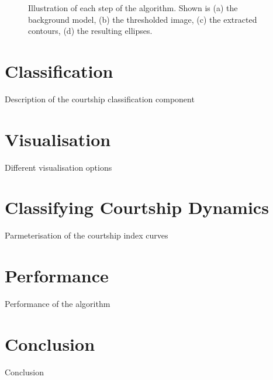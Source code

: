 \documentclass[acmtocl]{acmtrans2m}
\begin{document}
\begin{figure}
	\label{fig:tracking}
	\caption{Illustration of each step of the algorithm. Shown is (a) the background model, (b) the thresholded image, (c) the extracted contours, (d) the resulting ellipses.}
\end{figure}

\section{Classification}

Description of the courtship classification component

\section{Visualisation}

Different visualisation options

\section{Classifying Courtship Dynamics}

Parmeterisation of the courtship index curves

\section{Performance}

Performance of the algorithm

\section{Conclusion}

Conclusion
\end{document}
